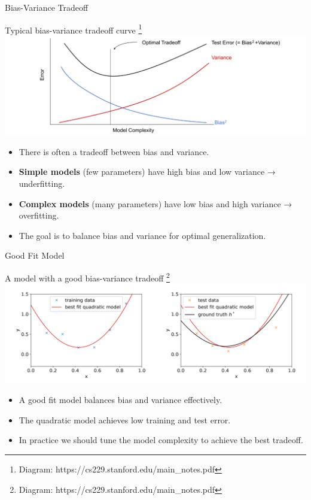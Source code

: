 \documentclass{beamer}
\begin{document}
\begin{frame}{Bias-Variance Tradeoff}
    \begin{center}
        \scriptsize{Typical bias-variance tradeoff curve \footnote{\tiny{Diagram: https://cs229.stanford.edu/main\_notes.pdf}}}
        \includegraphics[width=0.7\linewidth]{images/biasvar/biasVarianceTradeoff.png} \\
    \end{center}


    \begin{itemize}
        \item There is often a tradeoff between bias and variance.
        \item \textbf{Simple models} (few parameters) have high bias and low variance → underfitting.
        \item \textbf{Complex models} (many parameters) have low bias and high variance → overfitting.
        \item The goal is to balance bias and variance for optimal generalization.
    \end{itemize}
\end{frame}

\begin{frame}{Good Fit Model}
    \begin{center}
        \scriptsize{A model with a good bias-variance tradeoff \footnote{\tiny{Diagram: https://cs229.stanford.edu/main\_notes.pdf}}}
        \includegraphics[width=1\linewidth]{images/biasvar/goodfit.png} \\
    \end{center}

    \begin{itemize}
        \item A good fit model balances bias and variance effectively.
        \item The quadratic model achieves low training and test error.
        \item In practice we should tune the model complexity to achieve the best tradeoff.
    \end{itemize}
\end{frame}
\end{document}
